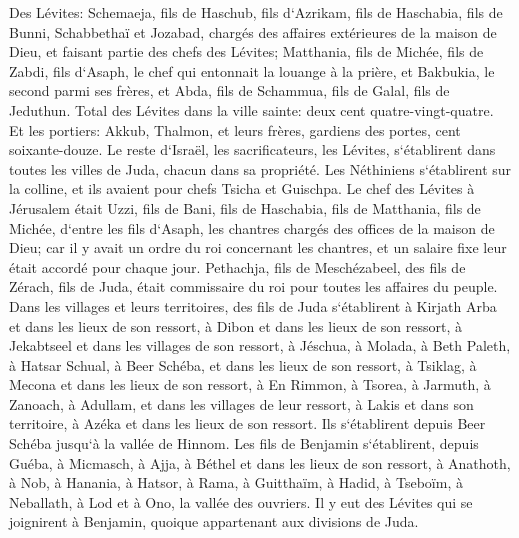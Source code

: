 \verse Des Lévites: Schemaeja, fils de Haschub, fils d`Azrikam, fils de Haschabia, fils de Bunni, 
\verse Schabbethaï et Jozabad, chargés des affaires extérieures de la maison de Dieu, et faisant partie des chefs des Lévites; 
\verse Matthania, fils de Michée, fils de Zabdi, fils d`Asaph, le chef qui entonnait la louange à la prière, et Bakbukia, le second parmi ses frères, et Abda, fils de Schammua, fils de Galal, fils de Jeduthun. 
\verse Total des Lévites dans la ville sainte: deux cent quatre-vingt-quatre. 
\verse Et les portiers: Akkub, Thalmon, et leurs frères, gardiens des portes, cent soixante-douze. 
\verse Le reste d`Israël, les sacrificateurs, les Lévites, s`établirent dans toutes les villes de Juda, chacun dans sa propriété. 
\verse Les Néthiniens s`établirent sur la colline, et ils avaient pour chefs Tsicha et Guischpa. 
\verse Le chef des Lévites à Jérusalem était Uzzi, fils de Bani, fils de Haschabia, fils de Matthania, fils de Michée, d`entre les fils d`Asaph, les chantres chargés des offices de la maison de Dieu; 
\verse car il y avait un ordre du roi concernant les chantres, et un salaire fixe leur était accordé pour chaque jour. 
\verse Pethachja, fils de Meschézabeel, des fils de Zérach, fils de Juda, était commissaire du roi pour toutes les affaires du peuple. 
\verse Dans les villages et leurs territoires, des fils de Juda s`établirent à Kirjath Arba et dans les lieux de son ressort, à Dibon et dans les lieux de son ressort, à Jekabtseel et dans les villages de son ressort, 
\verse à Jéschua, à Molada, à Beth Paleth, 
\verse à Hatsar Schual, à Beer Schéba, et dans les lieux de son ressort, 
\verse à Tsiklag, à Mecona et dans les lieux de son ressort, 
\verse à En Rimmon, à Tsorea, à Jarmuth, 
\verse à Zanoach, à Adullam, et dans les villages de leur ressort, à Lakis et dans son territoire, à Azéka et dans les lieux de son ressort. Ils s`établirent depuis Beer Schéba jusqu`à la vallée de Hinnom. 
\verse Les fils de Benjamin s`établirent, depuis Guéba, à Micmasch, à Ajja, à Béthel et dans les lieux de son ressort, 
\verse à Anathoth, à Nob, à Hanania, 
\verse à Hatsor, à Rama, à Guitthaïm, 
\verse à Hadid, à Tseboïm, à Neballath, 
\verse à Lod et à Ono, la vallée des ouvriers. 
\verse Il y eut des Lévites qui se joignirent à Benjamin, quoique appartenant aux divisions de Juda. 

